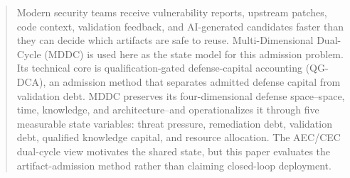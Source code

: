 ﻿\documentclass[lettersize,journal]{IEEEtran}
\begin{document}
\begin{abstract}
Modern security teams receive vulnerability reports, upstream patches, code context, validation feedback, and AI-generated candidates faster than they can decide which artifacts are safe to reuse. Multi-Dimensional Dual-Cycle (MDDC) is used here as the state model for this admission problem. Its technical core is qualification-gated defense-capital accounting (QG-DCA), an admission method that separates admitted defense capital from validation debt. MDDC preserves its four-dimensional defense space--space, time, knowledge, and architecture--and operationalizes it through five measurable state variables: threat pressure, remediation debt, validation debt, qualified knowledge capital, and resource allocation. The AEC/CEC dual-cycle view motivates the shared state, but this paper evaluates the artifact-admission method rather than claiming closed-loop deployment.


\end{abstract}
\end{document}

